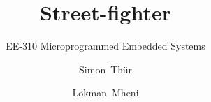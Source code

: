 \documentclass{beamer}
\title{Street-fighter}
\subtitle{EE-310 Microprogrammed Embedded Systems}
\author[Thür, Mheni]
{Simon~Thür \and Lokman~Mheni}
\institute[EPFL]{EPFL SEL-BA5}
\begin{document}
\frame{
    \titlepage
}
\end{document}
